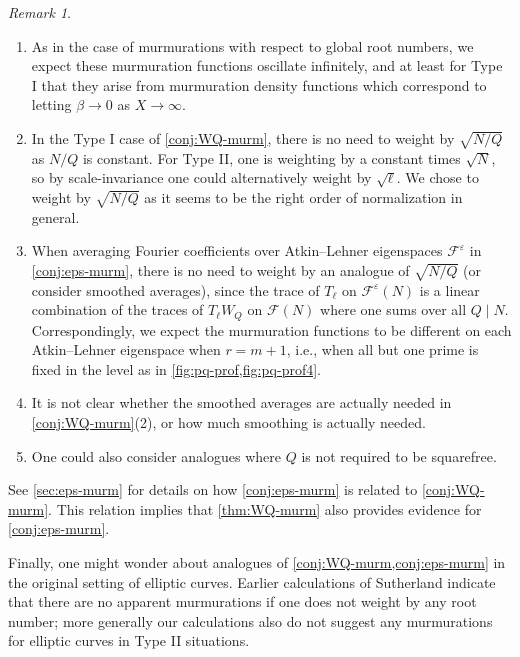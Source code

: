 \documentclass[11pt]{amsart}
\newcommand{\eps}{\varepsilon}
\numberwithin{lem}{section}
\theoremstyle{remark}
\newtheorem{rem}[lem]{Remark}
\theoremstyle{definition}
\numberwithin{equation}{section}
\begin{document}
\begin{rem} \label{rem:murm}
\begin{enumerate}
\item As in the case of murmurations with respect to global root numbers, we expect these murmuration functions oscillate infinitely, and at least for Type I that they arise from murmuration density functions which correspond to letting $\beta \to 0$ as $X \to \infty$.

\item In the Type I case of \cref{conj:WQ-murm}, there is no need to weight by $\sqrt{N/Q}$ as $N/Q$ is constant.  For Type II, one is  weighting by a constant times $\sqrt N$, so by scale-invariance one could alternatively weight by $\sqrt \ell$.  We chose to weight by $\sqrt{N/Q}$ as it seems to be the right order of normalization in general. 

\item When averaging Fourier coefficients over Atkin--Lehner eigenspaces $\mathcal F^\eps$ in \cref{conj:eps-murm}, there is no need to weight by an analogue of $\sqrt{N/Q}$ (or consider smoothed averages), since the trace of $T_\ell$ on $\mathcal F^\eps(N)$ is a linear combination of the traces of $T_\ell W_Q$ on $\mathcal F(N)$ where one sums over all $Q \mid N$.  Correspondingly, we expect the murmuration functions to be different on each Atkin--Lehner eigenspace when $r=m+1$, i.e., when all but one prime is fixed in the level as in \cref{fig:pq-prof,fig:pq-prof4}.  


\item It is not clear whether the smoothed averages are actually needed in \cref{conj:WQ-murm}(2), or how much smoothing is actually needed.

\item One could also consider analogues where $Q$ is not required to be squarefree.
\end{enumerate}
\end{rem}

See \cref{sec:eps-murm} for details on how \cref{conj:eps-murm} is related to \cref{conj:WQ-murm}.  This relation implies that \cref{thm:WQ-murm} also provides evidence for  \cref{conj:eps-murm}.

Finally, one might wonder about analogues of \cref{conj:WQ-murm,conj:eps-murm} in the original setting of elliptic curves.  Earlier calculations of Sutherland indicate that there are no apparent murmurations if one does not weight by any root number; more generally our calculations also do not suggest any murmurations for elliptic curves in Type II situations.  
\end{document}
